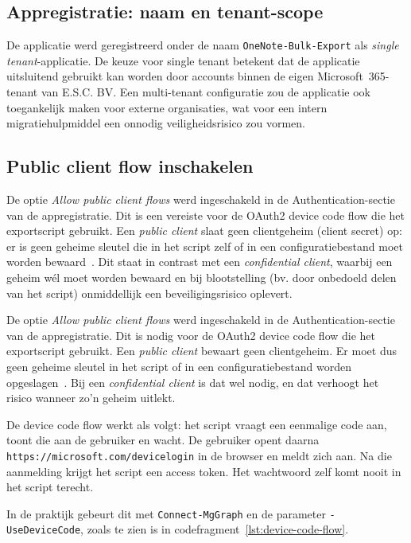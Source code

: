 \subsection{Appregistratie: naam en tenant-scope}
\label{subsec:appreg-tenant}

De applicatie werd geregistreerd onder de naam \texttt{OneNote-Bulk-Export} als \emph{single tenant}-applicatie. De keuze voor single tenant betekent dat de applicatie uitsluitend gebruikt kan worden door accounts binnen de eigen Microsoft~365-tenant van E.S.C. BV. Een multi-tenant configuratie zou de applicatie ook toegankelijk maken voor externe organisaties, wat voor een intern migratiehulpmiddel een onnodig veiligheidsrisico zou vormen.

\subsection{Public client flow inschakelen}
\label{subsec:public-client}

De optie \emph{Allow public client flows} werd ingeschakeld in de Authentication-sectie van de appregistratie. Dit is een vereiste voor de OAuth2 device code flow die het exportscript gebruikt. Een \emph{public client} slaat geen clientgeheim (client secret) op: er is geen geheime sleutel die in het script zelf of in een configuratiebestand moet worden bewaard~\autocite{microsoft2025devicecode}. Dit staat in contrast met een \emph{confidential client}, waarbij een geheim wél moet worden bewaard en bij blootstelling (bv. door onbedoeld delen van het script) onmiddellijk een beveiligingsrisico oplevert.

De optie \emph{Allow public client flows} werd ingeschakeld in de Authentication-sectie van de appregistratie. Dit is nodig voor de OAuth2 device code flow die het exportscript gebruikt. Een \emph{public client} bewaart geen clientgeheim. Er moet dus geen geheime sleutel in het script of in een configuratiebestand worden opgeslagen~\autocite{microsoft2025devicecode}. Bij een \emph{confidential client} is dat wel nodig, en dat verhoogt het risico wanneer zo'n geheim uitlekt.

De device code flow werkt als volgt: het script vraagt een eenmalige code aan, toont die aan de gebruiker en wacht. De gebruiker opent daarna \texttt{https://microsoft.com/\allowbreak devicelogin} in de browser en meldt zich aan. Na die aanmelding krijgt het script een access token. Het wachtwoord zelf komt nooit in het script terecht.

In de praktijk gebeurt dit met \texttt{Connect-MgGraph} en de parameter \texttt{-UseDeviceCode}, zoals te zien is in codefragment~\ref{lst:device-code-flow}.

